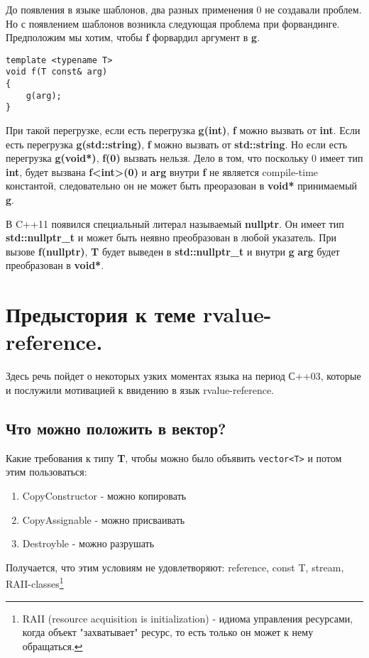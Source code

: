 \documentclass[12pt]{article}
\begin{document}
До появления в языке шаблонов, два разных применения 0 не создавали проблем. Но с появлением шаблонов возникла следующая проблема при форвандинге. Предположим мы хотим, чтобы {\bf f} форвардил аргумент в {\bf g}.
\begin{verbatim}
template <typename T>
void f(T const& arg)
{
    g(arg);
}
\end{verbatim}
При такой перегрузке, если есть перегрузка {\bf g(int)}, {\bf f} можно вызвать от {\bf int}. Если есть перегрузка {\bf g(std::string)}, {\bf f} можно вызвать от {\bf std::string}. Но если есть перегрузка {\bf g(void*)}, {\bf f(0)} вызвать нельзя. Дело в том, что поскольку 0 имеет тип {\bf int}, будет вызвана {\bf f<int>(0)} и {\bf arg} внутри {\bf f} не является compile-time константой, следовательно он не может быть преоразован в {\bf void*} принимаемый {\bf g}.

В C++11 появился специальный литерал называемый {\bf nullptr}. Он имеет тип {\bf std::nullptr\_t} и может быть неявно преобразован в любой указатель. При вызове {\bf f(nullptr)}, {\bf T} будет выведен в {\bf std::nullptr\_t} и внутри {\bf g} {\bf arg} будет преобразован в {\bf void*}.

\section{Предыстория к теме rvalue-reference.}
Здесь речь пойдет о некоторых узких моментах языка на период С++03, которые и послужили мотивацией к ввидению в язык rvalue-reference.
\subsection{Что можно положить в вектор?}
Какие требования к типу {\bf T}, чтобы можно было объявить \texttt{vector<T>} и потом этим пользоваться:
\begin{enumerate}
\item CopyConstructor - можно копировать
\item CopyAssignable - можно присваивать
\item Destroyble - можно разрушать
\end{enumerate}
Получается, что этим условиям не удовлетворяют: reference, const T, stream, RAII-classes\footnote{ RAII (resource acquisition is initialization) - идиома управления ресурсами, когда объект "захватывает" ресурс, то есть только он может к нему обращаться.}
\end{document}
